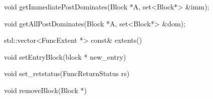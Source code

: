 \begin{apient}
void getImmediatePostDominates(Block *A, set<Block*> &imm);
\end{apient}

\begin{apient}
void getAllPostDominates(Block *A, set<Block*> &dom);
\end{apient}




\begin{apient}
std::vector<FuncExtent *> const& extents()
\end{apient}

\begin{apient}
void setEntryBlock(block * new_entry)
\end{apient}

\begin{apient}
void set_retstatus(FuncReturnStatus rs)
\end{apient}

\begin{apient}
void removeBlock(Block *)
\end{apient}
